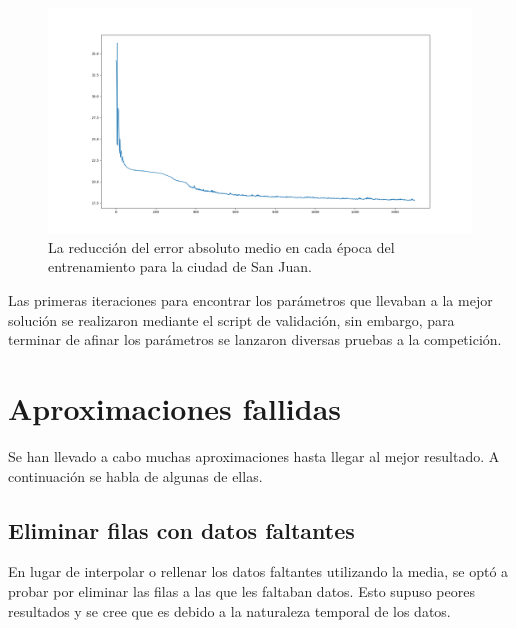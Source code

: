 \documentclass[acmtog, screen]{acmart}
\begin{document}
\begin{figure}[h]
	\includegraphics[width=\columnwidth]{lossSanJuan}
	\caption{La reducción del error absoluto medio en cada época del entrenamiento para la ciudad de San Juan.}
	\label{fig:lossSanJuan}
\end{figure}
Las primeras iteraciones para encontrar los parámetros que llevaban a la mejor solución se realizaron mediante el script de validación, sin embargo, para terminar de afinar los parámetros se lanzaron diversas pruebas a la competición.

\section{Aproximaciones fallidas}
Se han llevado a cabo muchas aproximaciones hasta llegar al mejor resultado. A continuación se habla de algunas de ellas.
\subsection{Eliminar filas con datos faltantes}
En lugar de interpolar o rellenar los datos faltantes utilizando la media, se optó a probar por eliminar las filas a las que les faltaban datos. Esto supuso peores resultados y se cree que es debido a la naturaleza temporal de los datos.
\end{document}
